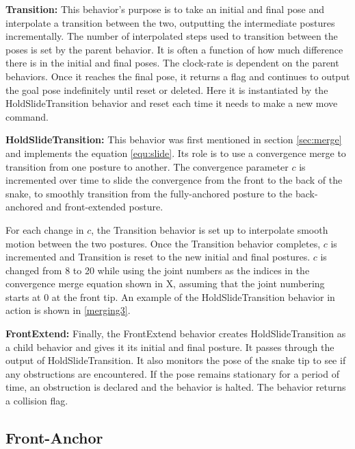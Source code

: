 \textbf{Transition:} This behavior's purpose is to take an initial and final pose and interpolate a transition between the two, outputting the intermediate postures incrementally. The number of interpolated steps used to transition between the poses is set by the parent behavior. It is often a function of how much difference there is in the initial and final poses. The clock-rate is dependent on the parent behaviors. Once it reaches the final pose, it returns a flag and continues to output the goal pose indefinitely until reset or deleted. Here it is instantiated by the HoldSlideTransition behavior and reset each time it needs to make a new move command.

\textbf{HoldSlideTransition:} This behavior was first mentioned in section \autoref{sec:merge} and implements the equation \autoref{equ:slide}. Its role is to use a convergence merge to transition from one posture to another. The convergence parameter $c$ is incremented over time to slide the convergence from the front to the back of the snake, to smoothly transition from the fully-anchored posture to the back-anchored and front-extended posture.

For each change in $c$, the Transition behavior is set up to interpolate smooth motion between the two postures. Once the Transition behavior completes, $c$ is incremented and Transition is reset to the new initial and final postures. $c$ is changed from 8 to 20 while using the joint numbers as the indices in the convergence merge equation shown in X, assuming that the joint numbering starts at 0 at the front tip. An example of the HoldSlideTransition behavior in action is shown in \autoref{merging3}.

\textbf{FrontExtend:} Finally, the FrontExtend behavior creates HoldSlideTransition as a child behavior and gives it its initial and final posture. It passes through the output of HoldSlideTransition. It also monitors the pose of the snake tip to see if any obstructions are encountered. If the pose remains stationary for a period of time, an obstruction is declared and the behavior is halted. The behavior returns a collision flag.

\subsection{Front-Anchor}
\label{front-anchor}

